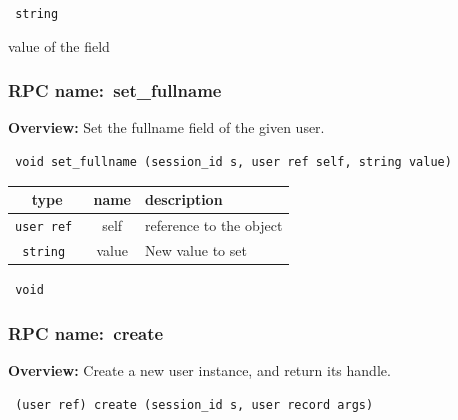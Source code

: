 \vspace{0.3cm}

{\tt 
string
}


value of the field
\vspace{0.3cm}
\vspace{0.3cm}
\vspace{0.3cm}
\subsubsection{RPC name:~set\_fullname}

{\bf Overview:} 
Set the fullname field of the given user.

\begin{verbatim} void set_fullname (session_id s, user ref self, string value)\end{verbatim}



 
\vspace{0.3cm}
\begin{tabular}{|c|c|p{7cm}|}
 \hline
{\bf type} & {\bf name} & {\bf description} \\ \hline
{\tt user ref } & self & reference to the object \\ \hline 

{\tt string } & value & New value to set \\ \hline 

\end{tabular}

\vspace{0.3cm}

{\tt 
void
}



\vspace{0.3cm}
\vspace{0.3cm}
\vspace{0.3cm}
\subsubsection{RPC name:~create}

{\bf Overview:} 
Create a new user instance, and return its handle.

\begin{verbatim} (user ref) create (session_id s, user record args)\end{verbatim}



